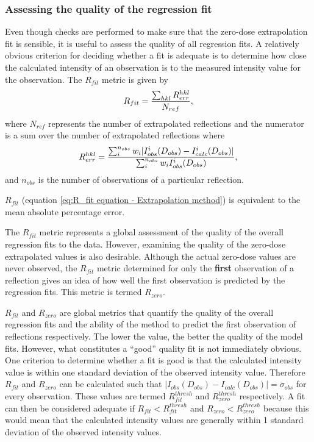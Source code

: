 \subsubsection{Assessing the quality of the regression fit}
\label{subs:Assessing the quality of the regression fit}
Even though checks are performed to make sure that the zero-dose extrapolation fit is sensible, it is useful to assess the quality of all regression fits.
A relatively obvious criterion for deciding whether a fit is adequate is to determine how close the calculated intensity of an observation is to the measured intensity value for the observation.
The $R_{fit}$ metric is given by
\begin{equation}
    R_{fit} = \frac{\sum_{hkl} R^{hkl}_{err}}{N_{ref}},
    \label{eq:R_fit equation - Extrapolation method}
\end{equation}
where $N_{ref}$ represents the number of extrapolated reflections and the numerator is a sum over the number of extrapolated reflections where
\begin{equation}
    R^{hkl}_{err} = \frac{\sum_i^{n_{obs}} w_i |I^i_{obs}(D_{obs}) - I^i_{calc}(D_{obs})|}{\sum_i^{n_{obs}} w_i I^i_{obs}(D_{obs})},
\end{equation}
and $n_{obs}$ is the number of observations of a particular reflection.

$R_{fit}$ (equation \ref{eq:R_fit equation - Extrapolation method}) is equivalent to the mean absolute percentage error.

The $R_{fit}$ metric represents a global assessment of the quality of the overall regression fits to the data.
However, examining the quality of the zero-dose extrapolated values is also desirable.
Although the actual zero-dose values are never observed, the $R_{fit}$ metric determined for only the \textbf{first} observation of a reflection gives an idea of how well the first observation is predicted by the regression fits.
This metric is termed $R_{zero}$.

$R_{fit}$ and $R_{zero}$ are global metrics that quantify the quality of the overall regression fits and the ability of the method to predict the first observation of reflections respectively.
The lower the value, the better the quality of the model fits.
However, what constitutes a ``good'' quality fit is not immediately obvious.
One criterion to determine whether a fit is good is that the calculated intensity value is within one standard deviation of the observed intensity value.
Therefore $R_{fit}$ and $R_{zero}$ can be calculated such that $|I_{obs}(D_{obs}) - I_{calc}(D_{obs})| = \sigma_{obs}$ for every observation.
These values are termed $R^{thresh}_{fit}$ and $R^{thresh}_{zero}$ respectively.
A fit can then be considered adequate if $R_{fit} < R^{thresh}_{fit}$ and $R_{zero} < R^{thresh}_{zero}$ because this would mean that the calculated intensity values are generally within 1 standard deviation of the observed intensity values.

